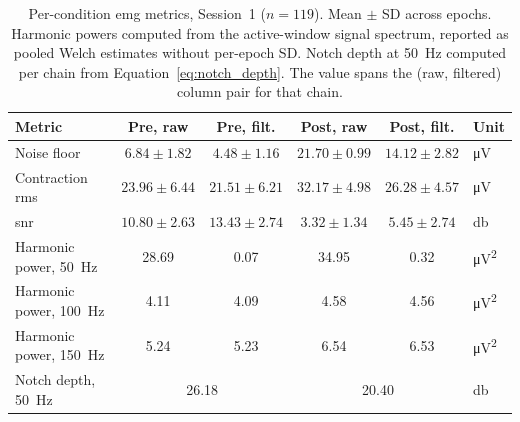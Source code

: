 \begin{table}[!htbp]
  \centering
  \caption{Per-condition \gls{emg} metrics, Session~1 ($n = \num{119}$). Mean $\pm$ SD across epochs. Harmonic powers computed from the active-window signal spectrum, reported as pooled Welch estimates without per-epoch SD. Notch depth at \SI{50}{\hertz} computed per chain from Equation~\ref{eq:notch_depth}. The value spans the (raw, filtered) column pair for that chain.}
  \label{tab:q4-emg-metrics}
  \begin{tabular}{l c c c c l}
    \toprule
    \textbf{Metric} & \textbf{Pre, raw} & \textbf{Pre, filt.} & \textbf{Post, raw} & \textbf{Post, filt.} & \textbf{Unit} \\
    \midrule
    Noise floor          & $\num{6.84}  \pm \num{1.82}$ & $\num{4.48}  \pm \num{1.16}$ & $\num{21.70} \pm \num{0.99}$ & $\num{14.12} \pm \num{2.82}$ & \si{\micro\volt} \\
    Contraction \gls{rms} & $\num{23.96} \pm \num{6.44}$ & $\num{21.51} \pm \num{6.21}$ & $\num{32.17} \pm \num{4.98}$ & $\num{26.28} \pm \num{4.57}$ & \si{\micro\volt} \\
    \gls{snr}             & $\num{10.80} \pm \num{2.63}$ & $\num{13.43} \pm \num{2.74}$ & $\num{3.32}  \pm \num{1.34}$ & $\num{5.45}  \pm \num{2.74}$ & \si{\decibel} \\
    \addlinespace
    Harmonic power, \SI{50}{\hertz}  & \num{28.69} & \num{0.07} & \num{34.95} & \num{0.32} & \si{\micro\volt\squared} \\
    Harmonic power, \SI{100}{\hertz} & \num{4.11}  & \num{4.09} & \num{4.58}  & \num{4.56} & \si{\micro\volt\squared} \\
    Harmonic power, \SI{150}{\hertz} & \num{5.24}  & \num{5.23} & \num{6.54}  & \num{6.53} & \si{\micro\volt\squared} \\
    \addlinespace
    Notch depth, \SI{50}{\hertz} & \multicolumn{2}{c}{\num{26.18}} & \multicolumn{2}{c}{\num{20.40}} & \si{\decibel} \\
    \bottomrule
  \end{tabular}
\end{table}

\FloatBarrier

 
%
 
